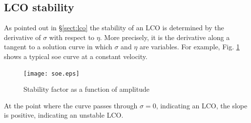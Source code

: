 \documentclass[11pt,openany,twoside]{book}
\numberwithin{equation}{section}		%
\newcommand{\Sectref}[1]{\S\ref{#1}}
\newcommand{\Figref}[1]{Fig. \ref{#1}}  %
\begin{document}
\subsection{LCO stability}\label{sect:lcostab}
As pointed out in \Sectref{sect:lco} the stability of an LCO is
determined by the derivative of $\sigma$ with respect to $\eta$.
More precisely, it is the derivative along a tangent to a solution
curve in which $\sigma$ and $\eta$ are variables. For example,
\Figref{fig:soe} shows a typical soe curve at a constant velocity.
\begin{figure}[ht] 	%
		\texttt{[image: soe.eps]}
	\centering
	\caption{Stability factor as a function of amplitude}\label{fig:soe}
\end{figure}
At the point where the curve passes through $\sigma=0$, indicating an
LCO, the slope is positive, indicating an unstable
LCO.
\end{document}
